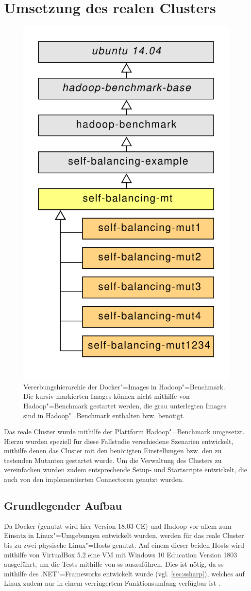 \section{Umsetzung des realen Clusters}
\label{sec:realCluster}

\begin{figure}
    \includegraphics[width=0.4\columnwidth]
    {./resources/hadoopBenchDockerInherits.pdf}
    \caption[Vererbungshierarchie der Docker"=Images in Hadoop"=Benchmark]
    {Vererbungshierarchie der Docker"=Images in Hadoop"=Benchmark.
    Die kursiv markierten Images können nicht mithilfe von Hadoop"=Benchmark gestartet werden, die grau unterlegten Images sind in Hadoop"=Benchmark enthalten bzw. benötigt.}
    \label{fig:hadoopBenchDockerInherits}
\end{figure}

Das reale Cluster wurde mithilfe der Plattform Hadoop"=Benchmark umgesetzt.
Hierzu wurden speziell für diese Fallstudie verschiedene Szenarien entwickelt, mithilfe denen das Cluster mit den benötigten Einstellungen bzw. den zu testenden Mutanten gestartet wurde.
Um die Verwaltung des Clusters zu vereinfachen wurden zudem entsprechende Setup- und Startscripte entwickelt, die auch von den implementierten Connectoren genutzt wurden.

\subsection{Grundlegender Aufbau}
\label{subsec:clusterBasics}

Da Docker (genutzt wird hier Version 18.03 CE) und Hadoop vor allem zum Einsatz in Linux"=Umgebungen entwickelt wurden, werden für das reale Cluster bis zu zwei physische Linux"=Hosts genutzt.
Auf einem dieser beiden Hosts wird mithilfe von VirtualBox 5.2 eine VM mit Windows 10 Education Version 1803 ausgeführt, um die Tests mithilfe von \ac{ss} auszuführen.
Dies ist nötig, da \ac{ss} mithilfe des .NET"=Frameworks entwickelt wurde (vgl. \cref{sec:ssharp}), welches auf Linux zudem nur in einem verringertem Funktionsumfang verfügbar ist \cite{Schwichtenberg2017}.

